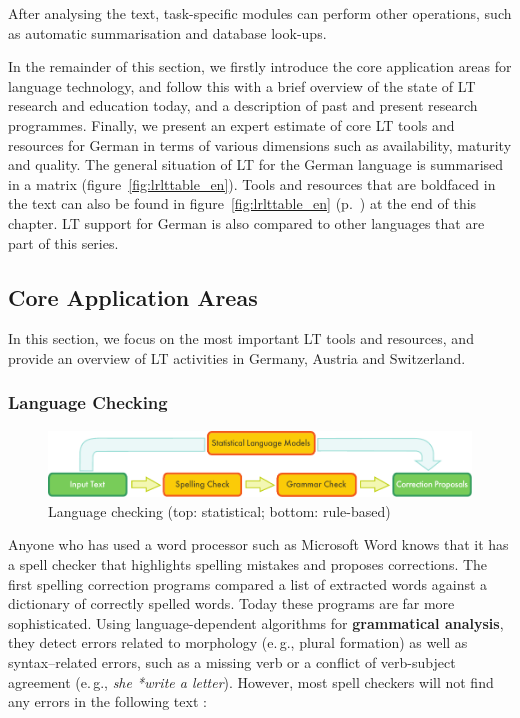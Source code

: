 \documentclass[]{../../metanetpaper}
\begin{document}
\begin{multicols}{2}
After analysing the text, task-specific modules can perform other operations, such as automatic summarisation and database look-ups.

In the remainder of this section, we firstly introduce the core application areas for language technology, and follow this with a brief overview of the state of LT research and education today, and a description of past and present research programmes. Finally, we present an expert estimate of core LT tools and resources for German in terms of various dimensions such as availability, maturity and quality. The general situation of LT for the German language is summarised in a matrix (figure~\ref{fig:lrlttable_en}). Tools and resources that are boldfaced in the text can also be found in figure~\ref{fig:lrlttable_en} (p.~\pageref{fig:lrlttable_en}) at the end of this chapter. LT support for German is also compared to other languages that are part of this series.

\subsection{Core Application Areas}

In this section, we focus on the most important LT tools and resources, and provide an overview of LT activities in Germany, Austria and Switzerland. 

\subsubsection{Language Checking}

\begin{figure}[t]
  \center
  \includegraphics[width=\textwidth]{../_media/english/language_checking}
  \caption{Language checking (top: statistical; bottom: rule-based)}
  \label{fig:langcheckingaarch_en}
\end{figure}

Anyone who has used a word processor such as Microsoft Word knows that it has a spell checker that highlights spelling mistakes and proposes corrections. The first spelling correction programs compared a list of extracted words against a dictionary of correctly spelled words. Today these programs are far more sophisticated. Using language-dependent algorithms for \textbf{grammatical analysis}, they detect errors related to morphology (e.\,g., plural formation) as well as syntax–related errors, such as a missing verb or a conflict of verb-subject agreement (e.\,g., \textit{she *write a letter}). However, most spell checkers will not find any errors in the following text \cite{zar1}:


\end{multicols}
\end{document}
